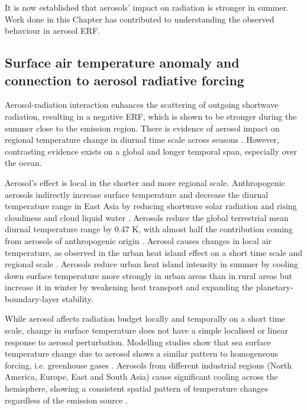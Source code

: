 It is now established that aerosols' impact on radiation is stronger in summer. Work done in this Chapter has contributed to understanding the observed behaviour in aerosol ERF.


\subsection{Surface air temperature anomaly and connection to aerosol radiative forcing}
\label{ch4:sec:seasonal-tas}

Aerosol-radiation interaction enhances the scattering of outgoing shortwave radiation, resulting in a negative ERF, which is shown to be stronger during the summer close to the emission region. There is evidence of aerosol impact on regional temperature change in diurnal time scale across seasons \citep[e.g. ][]{hanMechanismsSeasonalDifferences2020}. However, contrasting evidence exists on a global and longer temporal span, especially over the ocean. 

Aerosol's effect is local in the shorter and more regional scale. Anthropogenic aerosols indirectly increase surface temperature and decrease the diurnal temperature range in East Asia by reducing shortwave solar radiation and rising cloudiness and cloud liquid water \citep{huangImpactAerosolIndirect2006}. Aerosols reduce the global terrestrial mean diurnal temperature range by 0.47 K, with almost half the contribution coming from aerosols of anthropogenic origin \citep{chakrabortyLandCoverRegulates2019}. Aerosol causes changes in local air temperature, as observed in the urban heat island effect on a short time scale and regional scale \citep{hanMechanismsSeasonalDifferences2020}. %
Aerosols reduce urban heat island intensity in summer by cooling down surface temperature more strongly in urban areas than in rural areas but increase it in winter by weakening heat transport and expanding the planetary-boundary-layer stability.

While aerosol affects radiation budget locally and temporally on a short time scale, change in surface temperature does not have a simple localised or linear response to aerosol perturbation. Modelling studies show that sea surface temperature change due to aerosol shows a similar pattern to homogeneous forcing, i.e. greenhouse gases \citep{xieSimilarSpatialPatterns2013,kasoarSimilarSpatialPatterns2018}. Aerosols from different industrial regions (North America, Europe, East and South Asia) cause significant cooling across the hemisphere, showing a consistent spatial pattern of temperature changes regardless of the emission source \citep{kasoarSimilarSpatialPatterns2018, lewinschalLocalRemoteTemperature2019}.  


